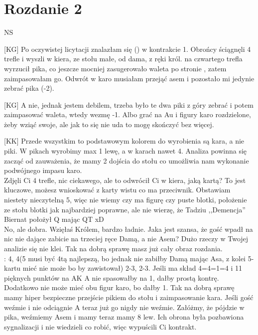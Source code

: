 \documentclass[12pt, a4paper]{article}
\begin{document}
\section*{Rozdanie 2}
\handdiagramv
{}
{}
{}
{}
{NS}

[KG] Po oczywistej licytacji znalazłam się () w kontrakcie 1\nt.
Obrońcy ściągnęli 4 trefle i wyszli w kiera, ze stołu małe, od  dama, z ręki król.
 na czwartego trefla wyrzucił pika, co jeszcze mocniej zasugerowało waleta po stronie ,
zatem zaimpasowałam go. Odwrót  w karo musiałam przejąć asem i pozostało mi jedynie zebrać pika (-2).

[KG] A nie, jednak jestem debilem, trzeba było te dwa piki z góry zebrać i potem zaimpasować waleta, wtedy wezmę -1.
Albo grać na A\hearts u  i figury karo rozdzielone, żeby wziąć swoje, ale jak to się nie uda to mogę skończyć bez więcej.

[KK] Przede wszystkim to podstawowym kolorem do 
wyrobienia są kara, a nie piki. W pikach wyrobimy 
max 1 lewę, a w karach nawet 4. Analiza powinna 
się zacząć od zauważenia, że mamy 2 dojścia 
do stołu co umożliwia nam wykonanie podwójnego 
impasu karo. \\
Zdjęli Ci 4 trefle, nic ciekawego, ale to 
 odwrócił Ci w kiera, jaką kartą?
To jest kluczowe, możesz wnioskować z karty 
wistu co ma przeciwnik. Obstawiam niestety 
nieczytelną 5, więc nie wiemy czy ma figurę 
czy puste blotki, położenie ze stołu blotki 
jak najbardziej poprawne, ale nie wierzę, że 
Tadziu ,,Demencja'' Biernat położył Q mając 
QT xD\\
No, ale dobra. Wzięłaś Królem, bardzo ładnie. 
Jaka jest szansa, że gość wpadł na nic nie 
dające zabicie na trzeciej ręce Damą, a nie 
Asem? Dużo rzeczy w Twojej analizie się nie klei. 
Tak na dobrą sprawę masz już cały obraz rozdania.\\ 
: 4\clubs, 4\hearts (5 musi być 4tą najlepszą, 
bo jednak 
nie zabiłby Damą mając Asa, z kolei 5-kartu 
mieć nie może bo by zawistował) 2-3\spades, 2-3\diams. 
Jeśli ma skład 4=4=1=4 i 11 pięknych punktów 
na AK A nie spasowałby na 1\diams, dałby prostą kontrę. 
Dodatkowo nie może mieć obu figur karo, bo dałby 1\nt. 
Tak na dobrą sprawę mamy hiper bezpieczne przejście 
pikiem do stołu i zaimpasowanie kara. Jeśli gość 
weźmie i nie odciągnie \xhearts A teraz już go nigdy nie 
weźmie. Załóżmy, że pójdzie w pika, weźmiemy Asem 
i mamy teraz mamy 8 lew. Ich obrona była pozbawiona 
sygnalizacji i nie wiedzieli co robić, więc 
wypuścili Ci kontrakt.
\end{document}
